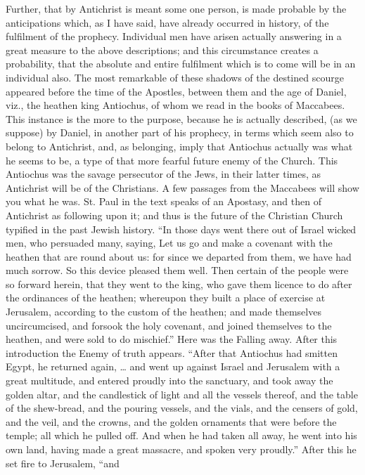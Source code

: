Further, that by Antichrist is meant some one person, is made
probable by the anticipations which, as I have said, have already
occurred in history, of the fulfilment of the prophecy. Individual men
have arisen actually answering in a great measure to the above
descriptions; and this circumstance creates a probability, that the
absolute and entire fulfilment which is to come will be in an
individual also. The most remarkable of these shadows of the destined
scourge appeared before the time of the Apostles, between them and the
age of Daniel, viz., the heathen king Antiochus, of whom we read in
the books of Maccabees. This instance is the more to the purpose,
because he is actually described, (as we suppose) by Daniel, in
another part of his prophecy, in terms which seem also to belong to
Antichrist, and, as belonging, imply that Antiochus actually was what
he seems to be, a type of that more fearful future enemy of the
Church. This Antiochus was the savage persecutor of the Jews, in their
latter times, as Antichrist will be of the Christians. A few
passages from the Maccabees will show you what he was. St. Paul in the
text speaks of an Apostasy, and then of Antichrist as following upon
it; and thus is the future of the Christian Church typified in the
past Jewish history. ``In those days went there out of Israel
wicked men, who persuaded many, saying, Let us go and make a covenant
with the heathen that are round about us: for since we departed from
them, we have had much sorrow. So this device pleased them well. Then
certain of the people were so forward herein, that they went to the
king, who gave them licence to do after the ordinances of the heathen;
whereupon they built a place of exercise at Jerusalem, according to
the custom of the heathen; and made themselves uncircumcised, and
forsook the holy covenant, and joined themselves to the heathen, and
were sold to do mischief.'' Here was the Falling away. After this
introduction the Enemy of truth appears. ``After that Antiochus
had smitten Egypt, he returned again, … and went up against Israel
and Jerusalem with a great multitude, and entered proudly into the
sanctuary, and took away the golden altar, and the candlestick of
light and all the vessels thereof, and the table of the shew-bread,
and the pouring vessels, and the vials, and the censers of gold, and
the veil, and the crowns, and the golden ornaments that were before
the temple; all which he pulled off. And when he had taken all away,
he went into his own land, having made a great massacre, and spoken
very proudly.'' After this he set fire to Jerusalem, ``and
